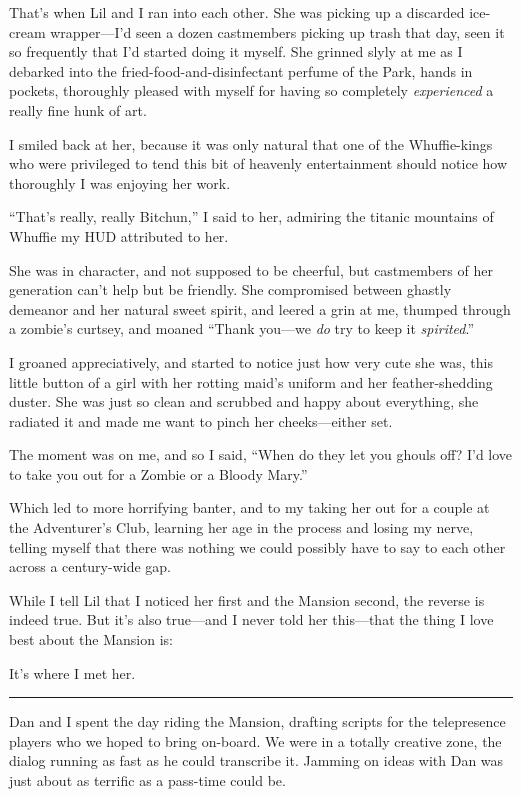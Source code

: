 That's when Lil and I ran into each other. She was picking up a
discarded ice-cream wrapper—I'd seen a dozen castmembers picking up
trash that day, seen it so frequently that I'd started doing it
myself. She grinned slyly at me as I debarked into the
fried-food-and-disinfectant perfume of the Park, hands in pockets,
thoroughly pleased with myself for having so completely
\emph{experienced} a really fine hunk of art.

I smiled back at her, because it was only natural that one of the
Whuffie-kings who were privileged to tend this bit of heavenly
entertainment should notice how thoroughly I was enjoying her
work.

“That's really, really Bitchun,” I said to her, admiring the
titanic mountains of Whuffie my HUD attributed to her.

She was in character, and not supposed to be cheerful, but
castmembers of her generation can't help but be friendly. She
compromised between ghastly demeanor and her natural sweet spirit,
and leered a grin at me, thumped through a zombie's curtsey, and
moaned “Thank you—we \emph{do} try to keep it \emph{spirited}.”

I groaned appreciatively, and started to notice just how very cute
she was, this little button of a girl with her rotting maid's
uniform and her feather-shedding duster. She was just so clean and
scrubbed and happy about everything, she radiated it and made me
want to pinch her cheeks—either set.

The moment was on me, and so I said, “When do they let you ghouls
off? I'd love to take you out for a Zombie or a Bloody Mary.”

Which led to more horrifying banter, and to my taking her out for a
couple at the Adventurer's Club, learning her age in the process
and losing my nerve, telling myself that there was nothing we could
possibly have to say to each other across a century-wide gap.

While I tell Lil that I noticed her first and the Mansion second,
the reverse is indeed true. But it's also true—and I never told her
this—that the thing I love best about the Mansion is:

It's where I met her.

\begin{center}\rule{3in}{0.4pt}\end{center}

Dan and I spent the day riding the Mansion, drafting scripts for
the telepresence players who we hoped to bring on-board. We were in
a totally creative zone, the dialog running as fast as he could
transcribe it. Jamming on ideas with Dan was just about as terrific
as a pass-time could be.

